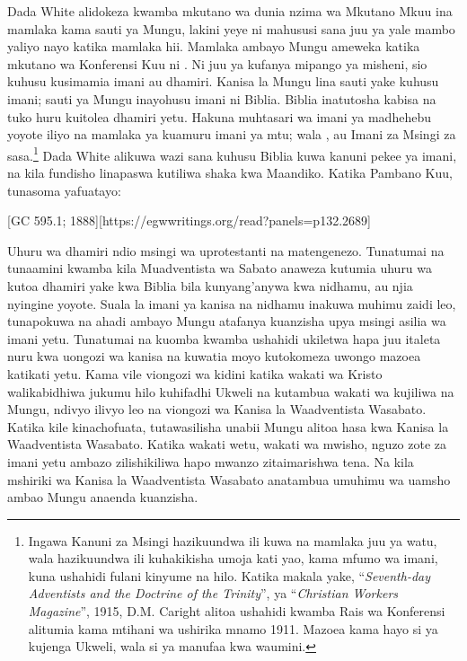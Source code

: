 Dada White alidokeza kwamba mkutano wa dunia nzima wa Mkutano Mkuu ina mamlaka kama sauti ya Mungu, lakini yeye ni mahususi sana juu ya yale mambo yaliyo nayo katika mamlaka hii. Mamlaka ambayo Mungu ameweka katika mkutano wa Konferensi Kuu ni . Ni juu ya kufanya mipango ya misheni, sio kuhusu kusimamia imani au dhamiri. Kanisa la Mungu lina sauti yake kuhusu imani; sauti ya Mungu inayohusu imani ni Biblia. Biblia inatutosha kabisa na tuko huru kuitolea dhamiri yetu. Hakuna muhtasari wa imani ya madhehebu yoyote iliyo na mamlaka ya kuamuru imani ya mtu; wala , au Imani za Msingi za sasa.\footnote{Ingawa Kanuni za Msingi hazikuundwa ili kuwa na mamlaka juu ya watu, wala hazikuundwa ili kuhakikisha umoja kati yao, kama mfumo wa imani, kuna ushahidi fulani kinyume na hilo. Katika makala yake, “\textit{Seventh-day Adventists and the Doctrine of the Trinity}”, ya “\textit{Christian Workers Magazine}”, 1915, D.M. Caright alitoa ushahidi kwamba Rais wa Konferensi alitumia  kama mtihani wa ushirika mnamo 1911. Mazoea kama hayo si ya kujenga Ukweli, wala si ya manufaa kwa waumini.} Dada White alikuwa wazi sana kuhusu Biblia kuwa kanuni pekee ya imani, na kila fundisho linapaswa kutiliwa shaka kwa Maandiko. Katika Pambano Kuu, tunasoma yafuatayo:


[GC 595.1; 1888][https://egwwritings.org/read?panels=p132.2689]


Uhuru wa dhamiri ndio msingi wa uprotestanti na matengenezo. Tunatumai na tunaamini kwamba kila Muadventista wa Sabato anaweza kutumia uhuru wa kutoa dhamiri yake kwa Biblia bila kunyang'anywa kwa nidhamu, au njia nyingine yoyote. Suala la imani ya kanisa na nidhamu inakuwa muhimu zaidi leo, tunapokuwa na ahadi ambayo Mungu atafanya kuanzisha upya msingi asilia wa imani yetu. Tunatumai na kuomba kwamba ushahidi ukiletwa hapa juu italeta nuru kwa uongozi wa kanisa na kuwatia moyo kutokomeza uwongo mazoea katikati yetu. Kama vile viongozi wa kidini katika wakati wa Kristo walikabidhiwa jukumu hilo kuhifadhi Ukweli na kutambua wakati wa kujiliwa na Mungu, ndivyo ilivyo leo na viongozi wa Kanisa la Waadventista Wasabato. Katika kile kinachofuata, tutawasilisha unabii Mungu alitoa hasa kwa Kanisa la Waadventista Wasabato. Katika wakati wetu, wakati wa mwisho, nguzo zote za imani yetu ambazo zilishikiliwa hapo mwanzo zitaimarishwa tena. Na kila mshiriki wa Kanisa la Waadventista Wasabato anatambua umuhimu wa uamsho ambao Mungu anaenda kuanzisha.



